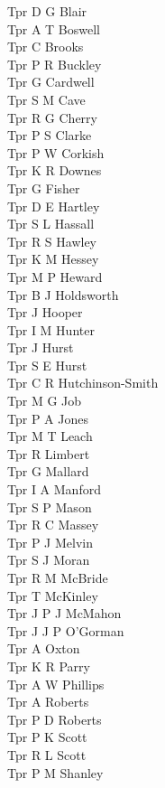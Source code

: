 \begin{multicols}{2}
  Tpr D G Blair \\
  Tpr A T Boswell \\
  Tpr C Brooks \\
  Tpr P R Buckley \\
  Tpr G Cardwell \\
  Tpr S M Cave \\
  Tpr R G Cherry \\
  Tpr P S Clarke \\
  Tpr P W Corkish \\
  Tpr K R Downes \\
  Tpr G Fisher \\
  Tpr D E Hartley \\
  Tpr S L Hassall \\
  Tpr R S Hawley \\
  Tpr K M Hessey \\
  Tpr M P Heward \\
  Tpr B J Holdsworth \\
  Tpr J Hooper \\
  Tpr I M Hunter \\
  Tpr J Hurst \\
  Tpr S E Hurst \\
  Tpr C R Hutchinson-Smith \\
  Tpr M G Job \\
  Tpr P A Jones \\
  Tpr M T Leach \\
  Tpr R Limbert \\
  Tpr G Mallard \\
  Tpr I A Manford \\
  Tpr S P Mason \\
  Tpr R C Massey \\
  Tpr P J Melvin \\
  Tpr S J Moran \\
  Tpr R M McBride \\
  Tpr T McKinley \\
  Tpr J P J McMahon \\
  Tpr J J P O'Gorman \\
  Tpr A Oxton \\
  Tpr K R Parry \\
  Tpr A W Phillips \\
  Tpr A Roberts \\
  Tpr P D Roberts \\
  Tpr P K Scott \\
  Tpr R L Scott \\
  Tpr P M Shanley \\

\end{multicols}
